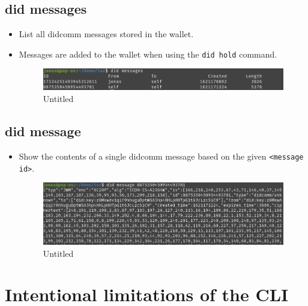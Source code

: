 \hypertarget{did-messages}{%
\subsection{did messages}\label{did-messages}}

\begin{itemize}
\item
  List all didcomm messages stored in the wallet.
\item
  Messages are added to the wallet when using the
  \passthrough{\lstinline!did hold!} command.

  \begin{figure}
  \centering
  \includegraphics{User Interface f8759a9462b24d5f95cf6123d68b89ea/Untitled 15.png}
  \caption{Untitled}
  \end{figure}
\end{itemize}

\hypertarget{did-message}{%
\subsection{\texorpdfstring{did message
}{did message }}\label{did-message}}

\begin{itemize}
\item
  Show the contents of a single didcomm message based on the given
  \passthrough{\lstinline!<message id>!}.

  \begin{figure}
  \centering
  \includegraphics{User Interface f8759a9462b24d5f95cf6123d68b89ea/Untitled 16.png}
  \caption{Untitled}
  \end{figure}
\end{itemize}

\hypertarget{intentional-limitations-of-the-cli}{%
\section{Intentional limitations of the
CLI}\label{intentional-limitations-of-the-cli}}

